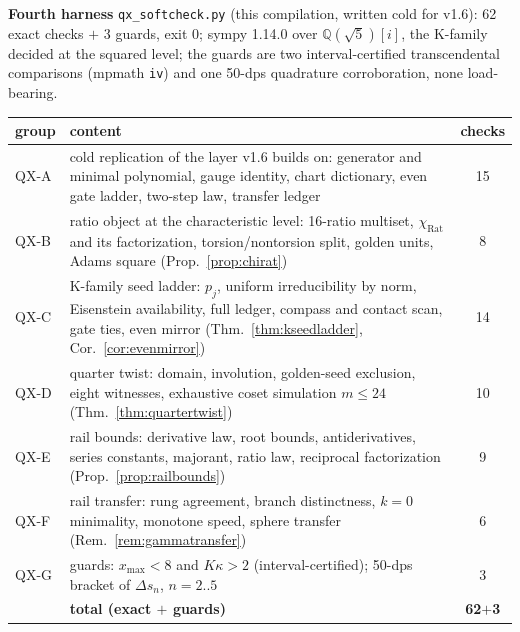 \documentclass[11pt]{article}
\newcommand{\Q}{\mathbb{Q}}
\theoremstyle{plain}
\theoremstyle{definition}
\theoremstyle{remark}
\begin{document}
\smallskip\noindent
\textbf{Fourth harness} \texttt{qx\_softcheck.py} (this compilation,
written cold for v1.6): 62 exact checks $+$ 3 guards, exit 0; sympy
1.14.0 over $\Q(\sqrt5)[i]$, the K-family decided at the squared level;
the guards are two interval-certified transcendental comparisons (mpmath
\texttt{iv}) and one 50-dps quadrature corroboration, none load-bearing.
\begin{center}\footnotesize\setlength{\tabcolsep}{4pt}
\begin{tabular}{@{}lp{11.6cm}c@{}}
\toprule
group & content & checks\\
\midrule
QX-A & cold replication of the layer v1.6 builds on: generator and minimal polynomial, gauge identity, chart dictionary, even gate ladder, two-step law, transfer ledger & 15\\
QX-B & ratio object at the characteristic level: 16-ratio multiset, $\chi_{\mathrm{Rat}}$ and its factorization, torsion/nontorsion split, golden units, Adams square (Prop.~\ref{prop:chirat}) & 8\\
QX-C & K-family seed ladder: $p_j$, uniform irreducibility by norm, Eisenstein availability, full ledger, compass and contact scan, gate ties, even mirror (Thm.~\ref{thm:kseedladder}, Cor.~\ref{cor:evenmirror}) & 14\\
QX-D & quarter twist: domain, involution, golden-seed exclusion, eight witnesses, exhaustive coset simulation $m\le24$ (Thm.~\ref{thm:quartertwist}) & 10\\
QX-E & rail bounds: derivative law, root bounds, antiderivatives, series constants, majorant, ratio law, reciprocal factorization (Prop.~\ref{prop:railbounds}) & 9\\
QX-F & rail transfer: rung agreement, branch distinctness, $k=0$ minimality, monotone speed, sphere transfer (Rem.~\ref{rem:gammatransfer}) & 6\\
QX-G & guards: $x_{\max}<8$ and $K\kappa>2$ (interval-certified); 50-dps bracket of $\Delta s_n$, $n=2..5$ & 3\\
\midrule
 & \textbf{total (exact $+$ guards)} & \textbf{62$+$3}\\
\bottomrule
\end{tabular}
\end{center}
\end{document}
